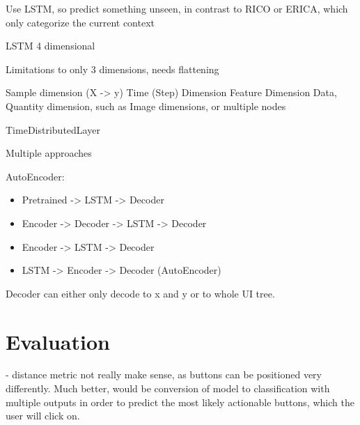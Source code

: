 Use LSTM, so predict something unseen, in contrast to RICO or ERICA, which only categorize the current context


LSTM 4 dimensional

Limitations to only 3 dimensions, needs flattening

Sample dimension (X -> y)
Time (Step) Dimension
Feature Dimension
Data, Quantity dimension, such as Image dimensions, or multiple nodes

TimeDistributedLayer


Multiple approaches


AutoEncoder:

\begin{itemize}
  \item Pretrained -> LSTM -> Decoder
  \item Encoder -> Decoder -> LSTM -> Decoder
  \item Encoder -> LSTM -> Decoder
  \item LSTM -> Encoder -> Decoder (AutoEncoder)
\end{itemize}

Decoder can either only decode to x and y or to whole UI tree.

\section{Evaluation}

- distance metric not really make sense, as buttons can be positioned very differently.
Much better, would be conversion of model to classification with multiple outputs in order to predict the most likely actionable buttons, which the user will click on.

